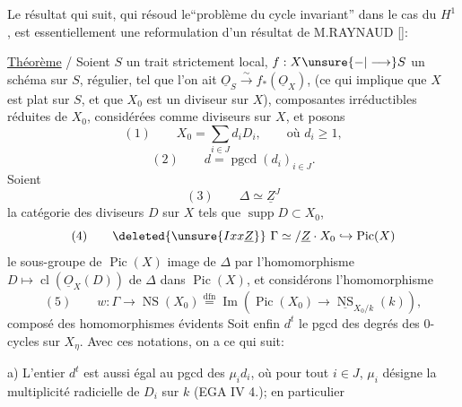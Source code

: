 

Le résultat qui suit, qui résoud le``problème du cycle invariant'' dans le cas du $H^1$, est essentiellement une reformulation d'un résultat de M.RAYNAUD [\quad]:
\margin{$\times$}

\uline{Théorème} / Soient $S$ un trait strictement local, $f:X\unsure{\mathbin{-}|\longrightarrow}S$ un schéma  sur $S$, régulier, tel que l'on ait $\underline{O}_S\xrightarrow{\sim}f_*(\underline{O}_X)$, (ce qui implique que $X$ est plat sur $S$, et que $X_0$ est un diviseur sur $X$),  composantes irréductibles réduites de $X_0$, considérées comme diviseurs sur $X$, et posons \unsure{$\times$}
\[
(1)\qquad X_0=\sum_{i\in J}d_iD_i,\qquad\text{où }d_i\geq1,
\]
\[
(2)\qquad d=\operatorname{pgcd}(d_i)_{i\in J}.
\]
Soient
\[
(3)\qquad\Delta\simeq\underline{Z}^{J}
\]
la catégorie des diviseurs $D$ sur $X$ tels que $\operatorname{supp}D\subset X_0$, 
\[
(4)\qquad\deleted{\unsure{Ixx\underline Z}}\ \Gamma\simeq/\underline Z\cdot X_0\hookrightarrow\operatorname{Pic}(X)
\]
le  sous-groupe de $\operatorname{Pic}(X)$ image de $\Delta$ par l'homomorphisme $D\mapsto\operatorname{cl}(\underline{O}_X(D))$ de $\Delta$ dans $\operatorname{Pic}(X)$, et considérons l'homomorphisme 
\[
(5)\qquad w:\Gamma\longrightarrow\operatorname{NS}(X_0)\overset{\mathrm{dfn}}{=}\operatorname{Im}(\operatorname{Pic}(X_0)\longrightarrow\underline{\operatorname{NS}}_{X_0/k}(k)),
\]
composé des homomorphismes évidents
Soit enfin $d^t$ le pgcd des degrés des 0-cycles sur $X_\eta$. Avec ces notations, on a ce qui suit:

a) L'entier $d^t$ est aussi égal au pgcd des $\mu_i d_i$, où pour tout $i\in J$, $\mu_i$ désigne la multiplicité radicielle de $D_i$ sur $k$ (EGA IV 4.\quad); en particulier 
\margin{$\times$}

